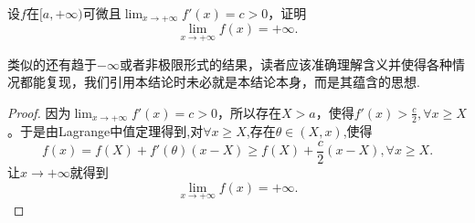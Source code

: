 \documentclass[lang=cn,newtx,10pt,scheme=chinese]{elegantbook}
\begin{document}
\begin{proposition}[导数有正增长率则函数爆炸]\label{proposition:导数有正增长率则函数爆炸}
设\(f\)在\([a,+\infty)\)可微且\(\lim_{x\rightarrow +\infty}f'(x)=c > 0\)，证明
\[\lim_{x\rightarrow +\infty}f(x)=+\infty.\]
\end{proposition}
\begin{note}
类似的还有趋于\(-\infty\)或者非极限形式的结果，读者应该准确理解含义并使得各种情况都能复现，我们引用本结论时未必就是本结论本身，而是其蕴含的思想.
\end{note}
\begin{proof}
因为\(\lim_{x\rightarrow +\infty}f'(x)=c > 0\)，所以存在\(X > a\)，使得\(f'(x)>\frac{c}{2},\forall x\geqslant X\)。于是由Lagrange中值定理得到,对$\forall x\geqslant X$,存在$\theta \in (X,x)$,使得
\[f(x)=f(X)+f'(\theta)(x - X)\geqslant f(X)+\frac{c}{2}(x - X),\forall x\geqslant X.\]
让\(x\rightarrow +\infty\)就得到
\[\lim_{x\rightarrow +\infty}f(x)=+\infty.\]
\end{proof}
\end{document}
